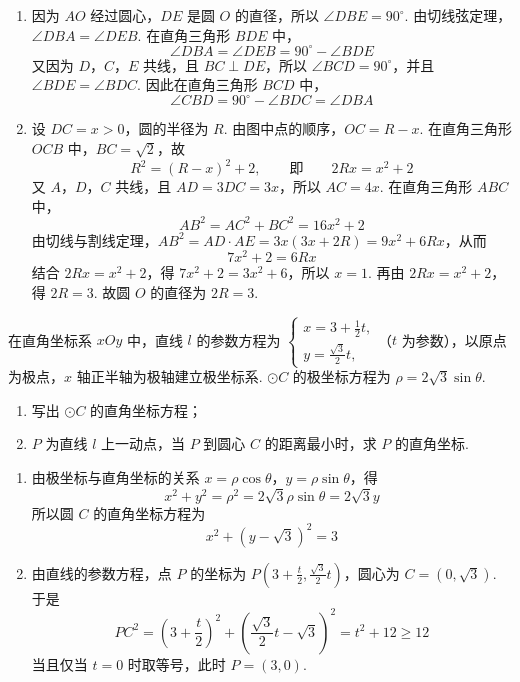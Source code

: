 \begin{solution}
\begin{enumerate}
\item
因为 \(AO\) 经过圆心，\(DE\) 是圆 \(O\) 的直径，所以 \(\angle DBE=90^\circ\). 由切线弦定理，\(\angle DBA=\angle DEB\). 在直角三角形 \(BDE\) 中，
\[
\angle DBA=\angle DEB=90^\circ-\angle BDE
\]
又因为 \(D\)，\(C\)，\(E\) 共线，且 \(BC\perp DE\)，所以 \(\angle BCD=90^\circ\)，并且 \(\angle BDE=\angle BDC\). 因此在直角三角形 \(BCD\) 中，
\[
\angle CBD=90^\circ-\angle BDC=\angle DBA
\]

\item
设 \(DC=x>0\)，圆的半径为 \(R\). 由图中点的顺序，\(OC=R-x\). 在直角三角形 \(OCB\) 中，\(BC=\sqrt{2}\)，故
\[
R^2=(R-x)^2+2,
\qquad\text{即}\qquad 2Rx=x^2+2
\]
又 \(A\)，\(D\)，\(C\) 共线，且 \(AD=3DC=3x\)，所以 \(AC=4x\). 在直角三角形 \(ABC\) 中，
\[
AB^2=AC^2+BC^2=16x^2+2
\]
由切线与割线定理，\(AB^2=AD\cdot AE=3x(3x+2R)=9x^2+6Rx\)，从而
\[
7x^2+2=6Rx
\]
结合 \(2Rx=x^2+2\)，得 \(7x^2+2=3x^2+6\)，所以 \(x=1\). 再由 \(2Rx=x^2+2\)，得 \(2R=3\). 故圆 \(O\) 的直径为 \(2R=3\).
\end{enumerate}
\end{solution}

 \begin{problem}
 在直角坐标系 \(xOy\) 中，直线 \(l\) 的参数方程为 \(\begin{cases}
x = 3 + \frac{1}{2} t,\\
y = \frac{\sqrt{3}}{2} t,
\end{cases}\)（\(t\) 为参数），以原点为极点，\(x\) 轴正半轴为极轴建立极坐标系. \(\odot C\) 的极坐标方程为 \(\rho = 2\sqrt{3}\sin \theta\).

\begin{enumerate}
\item 写出 \(\odot C\) 的直角坐标方程；
\item \(P\) 为直线 \(l\) 上一动点，当 \(P\) 到圆心 \(C\) 的距离最小时，求 \(P\) 的直角坐标.
 \end{enumerate}
 \end{problem}

\begin{solution}
\begin{enumerate}
\item
由极坐标与直角坐标的关系 \(x=\rho\cos\theta\)，\(y=\rho\sin\theta\)，得
\[
x^2+y^2=\rho^2=2\sqrt{3}\rho\sin\theta=2\sqrt{3}y
\]
所以圆 \(C\) 的直角坐标方程为
\[
x^2+(y-\sqrt{3})^2=3
\]

\item
由直线的参数方程，点 \(P\) 的坐标为 \(P\left(3+\frac{t}{2},\frac{\sqrt{3}}{2}t\right)\)，圆心为 \(C=(0,\sqrt{3})\). 于是
\[
PC^2=\left(3+\frac{t}{2}\right)^2+\left(\frac{\sqrt{3}}{2}t-\sqrt{3}\right)^2=t^2+12\geqslant12
\]
当且仅当 \(t=0\) 时取等号，此时 \(P=(3,0)\).
\end{enumerate}
\end{solution}

